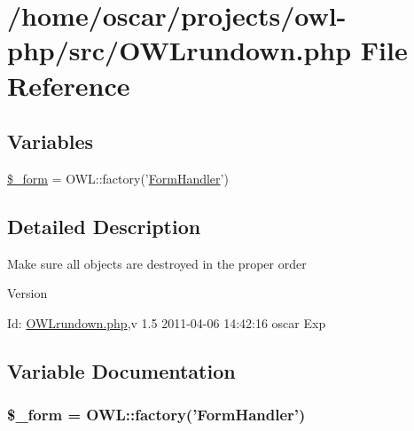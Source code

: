 \section{/home/oscar/projects/owl-\/php/src/OWLrundown.php File Reference}
\label{OWLrundown_8php}
\subsection*{Variables}
\begin{DoxyCompactItemize}
\item 
\hyperlink{OWLrundown_8php_ab14b242803551e0f269742a7103f149d}{\$\_\-form} = OWL::factory('\hyperlink{classFormHandler}{FormHandler}')
\end{DoxyCompactItemize}


\subsection{Detailed Description}
Make sure all objects are destroyed in the proper order \begin{DoxyVersion}{Version}

\end{DoxyVersion}
\begin{DoxyParagraph}{Id:}
\hyperlink{OWLrundown_8php}{OWLrundown.php},v 1.5 2011-\/04-\/06 14:42:16 oscar Exp 
\end{DoxyParagraph}


\subsection{Variable Documentation}
\subsubsection[{\$\_\-form}]{\setlength{\rightskip}{0pt plus 5cm}\$\_\-form = OWL::factory('{\bf FormHandler}')}\label{OWLrundown_8php_ab14b242803551e0f269742a7103f149d}
